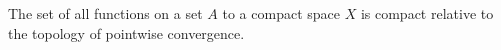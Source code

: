 The set of all functions on a set $A$ to a compact space $X$ is compact relative to the topology of pointwise convergence.
